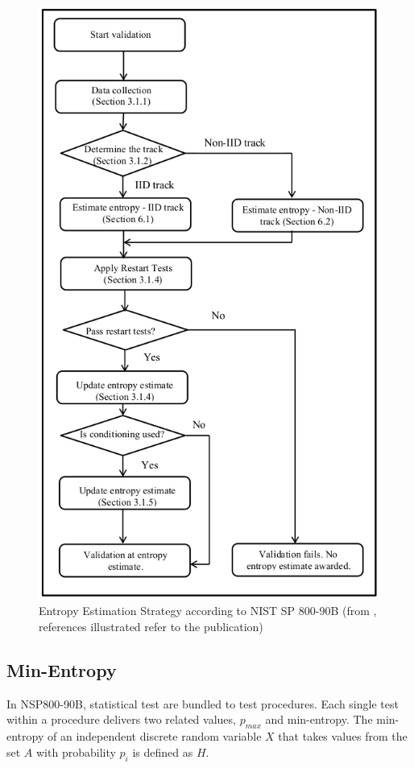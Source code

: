  \begin{figure}[H]
 	\centering
 	\includegraphics[scale=0.6]{img/nsp800-90b-entropy-est-strategy.png}
 	\caption{Entropy Estimation Strategy according to NIST SP 800-90B (from \cite{turan2018nist}, references illustrated refer to the publication)}
 	\label{fig-entropy-est-strategy}
 \end{figure}

\subsection{Min-Entropy}\label{sub:min-entropy}
In NSP800-90B, statistical test are bundled to test procedures. Each single test within a procedure delivers two related values, $p_{max}$ and min-entropy. The min-entropy of an independent discrete random variable $X$
that takes values from the set $A$ with probability $p_i$ is defined as $H$.

